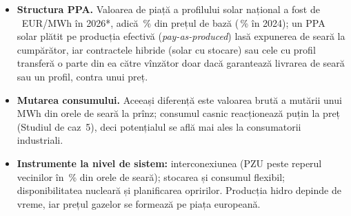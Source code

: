\begin{itemize}
\item {}%
{\textbf{Structura PPA.} Valoarea de piață a profilului solar național a fost de \NcapSol\ EUR/MWh în 2026*, adică \NcapRate\,\% din prețul de bază (\NcapRateTF\,\% în 2024); un PPA solar plătit pe producția efectivă (\emph{pay-as-produced}) lasă expunerea de seară la cumpărător, iar contractele hibride (solar cu stocare) sau cele cu profil transferă o parte din ea către vînzător doar dacă garantează livrarea de seară sau un profil, contra unui preț.}
\item {}%
{\textbf{Mutarea consumului.} Aceeași diferență este valoarea brută a mutării unui MWh din orele de seară la prînz; consumul casnic reacționează puțin la preț (Studiul de caz~5), deci potențialul se află mai ales la consumatorii industriali.}
\item {}%
{\textbf{Instrumente la nivel de sistem:} interconexiunea (PZU peste reperul vecinilor în \NaboveEve\,\% din orele de seară); stocarea și consumul flexibil; disponibilitatea nucleară și planificarea opririlor. Producția hidro depinde de vreme, iar prețul gazelor se formează pe piața europeană.}
\end{itemize}

